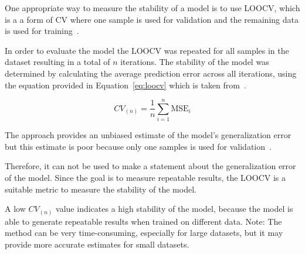 One appropriate way to measure the stability of a model is to use \ac{LOOCV}, which is a
a form of \ac{CV} where one sample is used for validation and the remaining data is
used for training~\cite[p. 200--201]{gareth2013introduction}.

In order to evaluate the model the \ac{LOOCV} was repeated for all samples in the dataset
resulting in a total of $n$ iterations.
The stability of the model was determined by calculating the average prediction error across all
iterations, using the equation provided in Equation~\ref{eq:loocv} which is taken from~\cite[p.
201]{gareth2013introduction}.

\begin{tcolorbox}[arc=0pt,boxrule=0.5pt]
    \begin{equation}
        CV_{(n)} = \frac{1}{n} \sum_{i=1}^{n} \text{MSE}_{i}\label{eq:loocv}
    \end{equation}
\end{tcolorbox}

The approach provides an unbiased estimate of the model's generalization error
but this estimate is poor because only one samples is used for validation~\cite[p.
201]{gareth2013introduction}.

Therefore, it can not be used to make a statement about the generalization error of the model.
Since the goal is to measure repeatable results, the \ac{LOOCV} is a suitable metric to measure
the stability of the model.

%

A low $CV_{(n)}$ value indicates a high stability of the model, because the model is able to
generate repeatable results when trained on different data.
Note: The method can be very time-consuming, especially for large datasets, but it may provide
more accurate estimates for small datasets.



